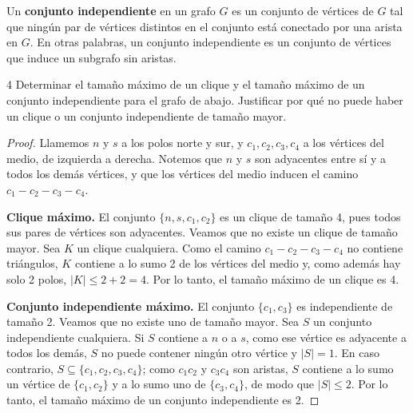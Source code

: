 \begin{definition}\label{def:conjunto-independiente}
    Un \textbf{conjunto independiente} en un grafo \( G \) es un conjunto de vértices de \( G \) tal que ningún par de vértices distintos en el conjunto está conectado por una arista en \( G \). En otras palabras, un conjunto independiente es un conjunto de vértices que induce un subgrafo sin aristas.
\end{definition}

\begin{ejercicio}{4}
    Determinar el tamaño máximo de un clique y el tamaño máximo de un conjunto independiente para el grafo de abajo. Justificar por qué no puede haber un clique o un conjunto independiente de tamaño mayor.
    \begin{center}
    \end{center}
\end{ejercicio}
\begin{proof}
    Llamemos \( n \) y \( s \) a los polos norte y sur, y \( c_1, c_2, c_3, c_4 \) a los vértices del medio, de izquierda a derecha. Notemos que \( n \) y \( s \) son adyacentes entre sí y a todos los demás vértices, y que los vértices del medio inducen el camino \( c_1 - c_2 - c_3 - c_4 \).

    \textbf{Clique máximo.} El conjunto \( \{ n, s, c_1, c_2 \} \) es un clique de tamaño 4, pues todos sus pares de vértices son adyacentes. Veamos que no existe un clique de tamaño mayor. Sea \( K \) un clique cualquiera. Como el camino \( c_1 - c_2 - c_3 - c_4 \) no contiene triángulos, \( K \) contiene a lo sumo 2 de los vértices del medio y, como además hay solo 2 polos, \( |K| \leq 2 + 2 = 4 \). Por lo tanto, el tamaño máximo de un clique es 4.

    \textbf{Conjunto independiente máximo.} El conjunto \( \{ c_1, c_3 \} \) es independiente de tamaño 2. Veamos que no existe uno de tamaño mayor. Sea \( S \) un conjunto independiente cualquiera. Si \( S \) contiene a \( n \) o a \( s \), como ese vértice es adyacente a todos los demás, \( S \) no puede contener ningún otro vértice y \( |S| = 1 \). En caso contrario, \( S \subseteq \{ c_1, c_2, c_3, c_4 \} \); como \( c_1c_2 \) y \( c_3c_4 \) son aristas, \( S \) contiene a lo sumo un vértice de \( \{ c_1, c_2 \} \) y a lo sumo uno de \( \{ c_3, c_4 \} \), de modo que \( |S| \leq 2 \). Por lo tanto, el tamaño máximo de un conjunto independiente es 2.
\end{proof}

